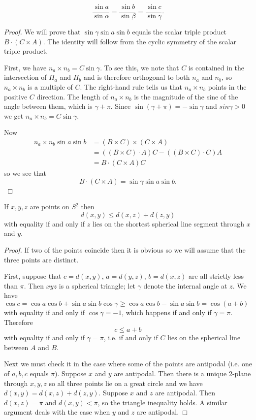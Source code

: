 \documentclass[12pt]{article}
\begin{document}
\begin{thm}
  \[\frac{\sin a}{\sin\alpha}=\frac{\sin b}{\sin\beta}=\frac{\sin c}{\sin\gamma}.\]
\end{thm}
\begin{proof}
  We will prove that $\sin\gamma\sin a\sin b$ equals the scalar triple product $B\cdot (C\times A)$. The identity will follow from the cyclic symmetry of the scalar triple product.

  First, we have $n_a\times n_b=C\sin\gamma$. To see this, we note that $C$ is contained in the intersection of $\Pi_a$ and $\Pi_b$ and is therefore orthogonal to both $n_a$ and $n_b$, so $n_a\times n_b$ is a multiple of $C$. The right-hand rule tells us that $n_a\times n_b$ points in the positive $C$ direction. The length of $n_a\times n_b$ is the magnitude of the sine of the angle between them, which is $\gamma+\pi$. Since $\sin(\gamma+\pi)=-\sin\gamma$ and $sin\gamma>0$ we get $n_a\times n_b=C\sin\gamma$.

  Now
  \begin{align*}
    n_a\times n_b \sin a\sin b&=(B\times C)\times(C\times A)\\
    &=((B\times C)\cdot A)C-((B\times C)\cdot C)A\\
    &=B\cdot(C\times A)C
  \end{align*}
  so we see that
  \[B\cdot(C\times A)=\sin\gamma\sin a\sin b.\]
\end{proof}


\begin{cor}\label{cor:triangle-inequality}
  If $x,y,z$ are points on $S^2$ then
  \[d(x,y)\leq d(x,z)+d(z,y)\]
  with equality if and only if $z$ lies on the shortest spherical line segment through $x$ and $y$.
\end{cor}
\begin{proof}
  If two of the points coincide then it is obvious so we will assume that the three points are distinct.
  
  First, suppose that $c=d(x,y)$, $a=d(y,z)$, $b=d(x,z)$ are all strictly less than $\pi$. Then $xyz$ is a spherical triangle; let $\gamma$ denote the internal angle at $z$.  We have $\cos c=\cos a\cos b+\sin a\sin b\cos\gamma\geq\cos a\cos b-\sin a\sin b=\cos(a+b)$ with equality if and only if $\cos\gamma=-1$, which happens if and only if $\gamma=\pi$. Therefore
  \[c\leq a+b\]
  with equality if and only if $\gamma=\pi$, i.e. if and only if $C$ lies on the spherical line between $A$ and $B$.

  Next we must check it in the case where some of the points are antipodal (i.e. one of $a,b,c$ equals $\pi$). Suppose $x$ and $y$ are antipodal. Then there is a unique 2-plane through $x,y,z$ so all three points lie on a great circle and we have $d(x,y)=d(x,z)+d(z,y)$. Suppose $x$ and $z$ are antipodal. Then $d(x,z)=\pi$ and $d(x,y)<\pi$, so the triangle inequality holds. A similar argument deals with the case when $y$ and $z$ are antipodal.
\end{proof}
\end{document}
